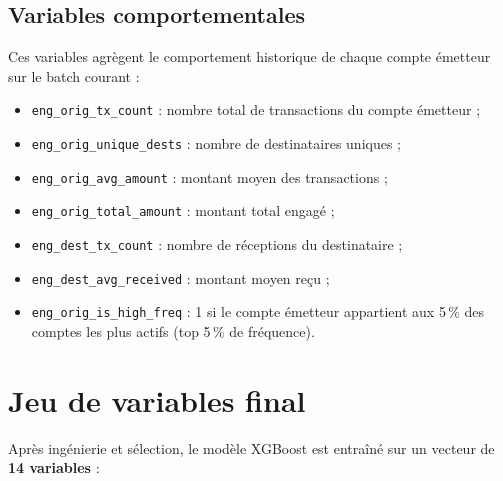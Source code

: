 \documentclass[12pt,a4paper,twoside]{report}
\theoremstyle{definition}
\begin{document}
\subsection{Variables comportementales}

Ces variables agrègent le comportement historique de chaque compte émetteur sur
le batch courant :

\begin{itemize}
  \item \texttt{eng\_orig\_tx\_count} : nombre total de transactions du compte émetteur ;
  \item \texttt{eng\_orig\_unique\_dests} : nombre de destinataires uniques ;
  \item \texttt{eng\_orig\_avg\_amount} : montant moyen des transactions ;
  \item \texttt{eng\_orig\_total\_amount} : montant total engagé ;
  \item \texttt{eng\_dest\_tx\_count} : nombre de réceptions du destinataire ;
  \item \texttt{eng\_dest\_avg\_received} : montant moyen reçu ;
  \item \texttt{eng\_orig\_is\_high\_freq} : 1 si le compte émetteur appartient aux
    5\,\% des comptes les plus actifs (top 5\,\% de fréquence).
\end{itemize}

\section{Jeu de variables final}

Après ingénierie et sélection, le modèle XGBoost est entraîné sur un vecteur de
\textbf{14 variables} :
\end{document}
